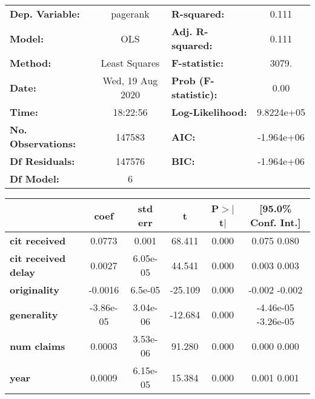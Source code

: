 \begin{center}
\begin{tabular}{lclc}
\toprule
\textbf{Dep. Variable:}     &     pagerank     & \textbf{  R-squared:         } &       0.111    \\
\textbf{Model:}             &       OLS        & \textbf{  Adj. R-squared:    } &       0.111    \\
\textbf{Method:}            &  Least Squares   & \textbf{  F-statistic:       } &       3079.    \\
\textbf{Date:}              & Wed, 19 Aug 2020 & \textbf{  Prob (F-statistic):} &       0.00     \\
\textbf{Time:}              &     18:22:56     & \textbf{  Log-Likelihood:    } &   9.8224e+05   \\
\textbf{No. Observations:}  &      147583      & \textbf{  AIC:               } &   -1.964e+06   \\
\textbf{Df Residuals:}      &      147576      & \textbf{  BIC:               } &   -1.964e+06   \\
\textbf{Df Model:}          &           6      & \textbf{                     } &                \\
\bottomrule
\end{tabular}
\begin{tabular}{lccccc}
                            & \textbf{coef} & \textbf{std err} & \textbf{t} & \textbf{P$>$$|$t$|$} & \textbf{[95.0\% Conf. Int.]}  \\
\midrule
\textbf{cit received}       &       0.0773  &        0.001     &    68.411  &         0.000        &         0.075     0.080       \\
\textbf{cit received delay} &       0.0027  &     6.05e-05     &    44.541  &         0.000        &         0.003     0.003       \\
\textbf{originality}        &      -0.0016  &      6.5e-05     &   -25.109  &         0.000        &        -0.002    -0.002       \\
\textbf{generality}         &    -3.86e-05  &     3.04e-06     &   -12.684  &         0.000        &     -4.46e-05 -3.26e-05       \\
\textbf{num claims}         &       0.0003  &     3.53e-06     &    91.280  &         0.000        &         0.000     0.000       \\
\textbf{year}               &       0.0009  &     6.15e-05     &    15.384  &         0.000        &         0.001     0.001       \\

\end{tabular}
\end{center}
